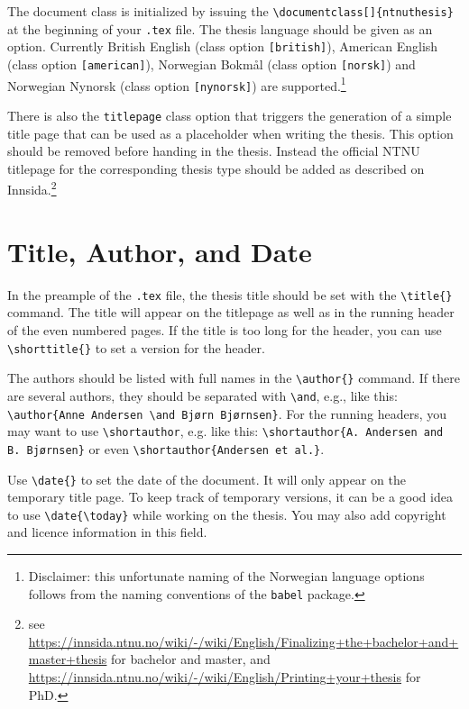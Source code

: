 {{The document class is initialized by issuing the \texttt{\textbackslash documentclass[]\{ntnuthesis\}} at the beginning of your \texttt{.tex} file. The thesis language should be given as an option. Currently British English (class option \texttt{[british]}), American English (class option \texttt{[american]}), Norwegian Bokmål (class option \texttt{[norsk]}) and Norwegian Nynorsk (class option \texttt{[nynorsk]}) are supported.\footnote{Disclaimer: this unfortunate naming of the Norwegian language options follows from the naming conventions of the \texttt{babel} package.}

There is also the \texttt{titlepage} class option that triggers the generation of a simple title page that can be used as a placeholder when writing the thesis. This option should be removed before handing in the thesis. Instead the official NTNU titlepage for the corresponding thesis type should be added as described on Innsida.\footnote{see \url{https://innsida.ntnu.no/wiki/-/wiki/English/Finalizing+the+bachelor+and+master+thesis} for bachelor and master, and \url{https://innsida.ntnu.no/wiki/-/wiki/English/Printing+your+thesis} for PhD.}

\section{Title, Author, and Date}

In the preample of the \texttt{.tex} file, the thesis title should be set with the \texttt{\textbackslash title\{\}} command. The title will appear on the titlepage as well as in the running header of the even numbered pages. If the title is too long for the header, you can use \texttt{\textbackslash shorttitle\{\}} to set a version for the header.

The authors should be listed with full names in the \texttt{\textbackslash author\{\}} command. If there are several authors, they should be separated with \texttt{\textbackslash and}, e.g., like this: \texttt{\textbackslash author\{Anne Andersen \textbackslash and Bjørn Bjørnsen\}}. For the running headers, you may want to use \texttt{\textbackslash shortauthor}, e.g. like this: \texttt{\textbackslash shortauthor\{A. Andersen and B. Bjørnsen\}} or even \texttt{\textbackslash shortauthor\{Andersen et al.\}}.

Use \texttt{\textbackslash date\{\}} to set the date of the document. It will only  appear on the temporary title page. To keep track of temporary versions, it can be a good idea to use \texttt{\textbackslash date\{\textbackslash today\}} while working on the thesis. You may also add copyright and licence information in this field.

}}
